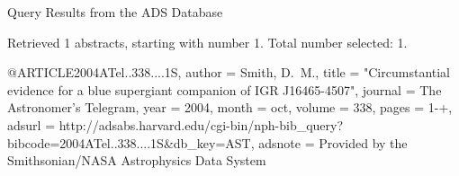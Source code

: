 Query Results from the ADS Database


Retrieved 1 abstracts, starting with number 1.  Total number selected: 1.

@ARTICLE{2004ATel..338....1S,
   author = {{Smith}, D.~M.},
    title = "{Circumstantial evidence for a blue supergiant companion of IGR J16465-4507}",
  journal = {The Astronomer's Telegram},
     year = 2004,
    month = oct,
   volume = 338,
    pages = {1-+},
   adsurl = {http://adsabs.harvard.edu/cgi-bin/nph-bib_query?bibcode=2004ATel..338....1S&db_key=AST},
  adsnote = {Provided by the Smithsonian/NASA Astrophysics Data System}
}


